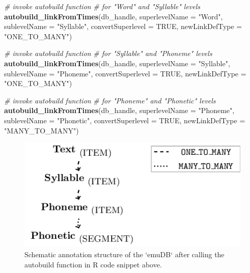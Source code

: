 \documentclass[]{book}
\newenvironment{Shaded}{\begin{snugshade}}{\end{snugshade}}
\newcommand{\CommentTok}[1]{\textcolor[rgb]{0.56,0.35,0.01}{\textit{#1}}}
\newcommand{\DataTypeTok}[1]{\textcolor[rgb]{0.13,0.29,0.53}{#1}}
\newcommand{\KeywordTok}[1]{\textcolor[rgb]{0.13,0.29,0.53}{\textbf{#1}}}
\newcommand{\NormalTok}[1]{#1}
\newcommand{\OtherTok}[1]{\textcolor[rgb]{0.56,0.35,0.01}{#1}}
\newcommand{\StringTok}[1]{\textcolor[rgb]{0.31,0.60,0.02}{#1}}
\begin{document}
\begin{Shaded}
\begin{Highlighting}[]
\CommentTok{# invoke autobuild function}
\CommentTok{# for "Word" and "Syllable" levels}
\KeywordTok{autobuild_linkFromTimes}\NormalTok{(db_handle,}
                        \DataTypeTok{superlevelName =} \StringTok{"Word"}\NormalTok{,}
                        \DataTypeTok{sublevelName =} \StringTok{"Syllable"}\NormalTok{,}
                        \DataTypeTok{convertSuperlevel =} \OtherTok{TRUE}\NormalTok{,}
                        \DataTypeTok{newLinkDefType =} \StringTok{"ONE_TO_MANY"}\NormalTok{)}

\CommentTok{# invoke autobuild function}
\CommentTok{# for "Syllable" and "Phoneme" levels}
\KeywordTok{autobuild_linkFromTimes}\NormalTok{(db_handle,}
                        \DataTypeTok{superlevelName =} \StringTok{"Syllable"}\NormalTok{,}
                        \DataTypeTok{sublevelName =} \StringTok{"Phoneme"}\NormalTok{,}
                        \DataTypeTok{convertSuperlevel =} \OtherTok{TRUE}\NormalTok{,}
                        \DataTypeTok{newLinkDefType =} \StringTok{"ONE_TO_MANY"}\NormalTok{)}

\CommentTok{# invoke autobuild function}
\CommentTok{# for "Phoneme" and "Phonetic" levels}
\KeywordTok{autobuild_linkFromTimes}\NormalTok{(db_handle,}
                        \DataTypeTok{superlevelName =} \StringTok{"Phoneme"}\NormalTok{,}
                        \DataTypeTok{sublevelName =} \StringTok{"Phonetic"}\NormalTok{,}
                        \DataTypeTok{convertSuperlevel =} \OtherTok{TRUE}\NormalTok{,}
                        \DataTypeTok{newLinkDefType =} \StringTok{"MANY_TO_MANY"}\NormalTok{)}
\end{Highlighting}
\end{Shaded}

\begin{figure}

{\centering \includegraphics[width=0.5\linewidth]{pics/tut_simpleAnnotStruct} 

}

\caption{Schematic annotation structure of the `emuDB` after calling the autobuild function in R code snippet above.}\label{fig:tutorial-simpleAnnotStruct}
\end{figure}
\end{document}
